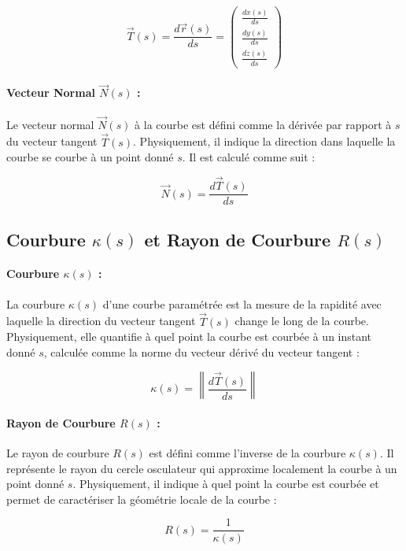 \documentclass[a4paper,12pt]{article}
\begin{document}
\[
\vec{T}(s) = \frac{d\vec{r}(s)}{ds} = \begin{pmatrix}
\frac{dx(s)}{ds} \\
\frac{dy(s)}{ds} \\
\frac{dz(s)}{ds}
\end{pmatrix}
\]


\paragraph{Vecteur Normal \(\vec{N}(s)\) :}

Le vecteur normal \(\vec{N}(s)\) à la courbe est défini comme la dérivée par rapport à \(s\) du vecteur tangent \(\vec{T}(s)\). Physiquement, il indique la direction dans laquelle la courbe se courbe à un point donné \(s\). Il est calculé comme suit :

\[
\vec{N}(s) = \frac{d\vec{T}(s)}{ds}
\]

\subsection{ Courbure $ \kappa(s) $ et Rayon de Courbure $ R(s) $ }

\paragraph{Courbure \(\kappa(s)\) :}

La courbure \(\kappa(s)\) d'une courbe paramétrée est la mesure de la rapidité avec laquelle la direction du vecteur tangent \(\vec{T}(s)\) change le long de la courbe. Physiquement, elle quantifie à quel point la courbe est courbée à un instant donné \(s\), calculée comme la norme du vecteur dérivé du vecteur tangent :

\[
\kappa(s) = \left\| \frac{d\vec{T}(s)}{ds} \right\|
\]

\paragraph{Rayon de Courbure \(R(s)\) :}

Le rayon de courbure \(R(s)\) est défini comme l'inverse de la courbure \(\kappa(s)\). Il représente le rayon du cercle osculateur qui approxime localement la courbe à un point donné \(s\). Physiquement, il indique à quel point la courbe est courbée et permet de caractériser la géométrie locale de la courbe :

\[
R(s) = \frac{1}{\kappa(s)}
\]

\newpage
\end{document}
